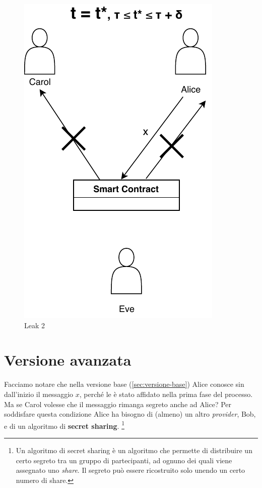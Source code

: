 \begin{figure}[H]
\begin{minipage}{0.4\textwidth}
		\includegraphics[width=.7\linewidth]{images/chap_protocollo/base-leak-2.pdf}
		\caption{Leak 2}
	\end{minipage}
\end{figure}

\section{Versione avanzata}
Facciamo notare che nella versione base (\ref{sec:versione-base})
Alice conosce sin
dall'inizio il messaggio
$ x $, perché le è stato affidato nella prima fase del processo.
Ma se Carol volesse che il messaggio rimanga segreto anche ad Alice?
Per soddisfare questa condizione Alice ha bisogno di (almeno) un altro \textit{provider},
Bob, e di un
algoritmo di \textbf{secret sharing}. \footnote{Un algoritmo di secret sharing
	è un algoritmo che permette di
	distribuire un certo segreto tra un gruppo di partecipanti, ad ognuno dei quali viene
	assegnato uno \textit{share}. Il segreto può essere ricostruito solo unendo un certo
	numero di share.}

